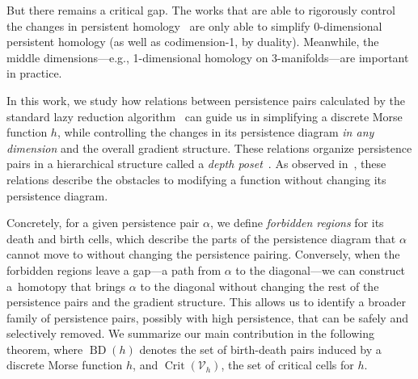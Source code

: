 \documentclass[a4paper,12pt, USenglish,cleveref,autoref,thm-restate]{article}
\newcommand{\mf}{h}
\DeclareMathOperator{\bd}{BD}
\newcommand{\fhR}{\mathcal{R}^\urcorner}
\newcommand{\fcR}{\mathcal{R}^\llcorner}
\newcommand{\RR}{\mathbb{R}}
\newcommand{\bds}{\alpha}
\newcommand{\cV}{\mathcal{V}}
\DeclareMathOperator{\crit}{Crit}
\begin{document}
\noindent But there remains a critical gap. The works that are able to rigorously control the changes in persistent homology~\cite{simplification2d,Attali2009,Bauer:2012aa} are only able to simplify 0-dimensional persistent homology (as well as codimension-1, by duality). Meanwhile, the middle dimensions---e.g., 1-dimensional homology on 3-manifolds---are important in practice.

\noindent In this work, 
    we study how relations between persistence pairs calculated by the standard lazy reduction algorithm~\cite{ELZ02,Vineyards}
    can guide us in simplifying a discrete Morse function $\mf$, while controlling the changes in its persistence diagram \emph{in any dimension} and the overall gradient structure.
These relations organize persistence pairs in a hierarchical structure called a \emph{depth poset}~\cite{EdLiMrSo2024}.  As observed in~\cite{TransDepth,BigSteps}, these relations describe the obstacles to modifying a function without changing its persistence diagram.

\noindent Concretely, for a given persistence pair $\alpha$, 
    we define \emph{forbidden regions} for its death and birth cells, 
    which describe the parts of the persistence diagram that $\alpha$ cannot move to without changing the persistence pairing.
Conversely, when the forbidden regions leave a gap---a path from $\alpha$ to the diagonal---we can construct a~homotopy
    that brings $\alpha$ to the diagonal without changing the rest of the persistence pairs and the gradient structure.
This allows us to identify a broader family of persistence pairs, possibly with high persistence, that can be safely and selectively removed. 
We summarize our main contribution in the following theorem, 
    where $\bd(\mf)$ denotes the set of birth-death pairs induced by a discrete Morse function $\mf$, and
    $\crit(\cV_{\mf})$, the set of critical cells for $\mf$.


\end{document}
